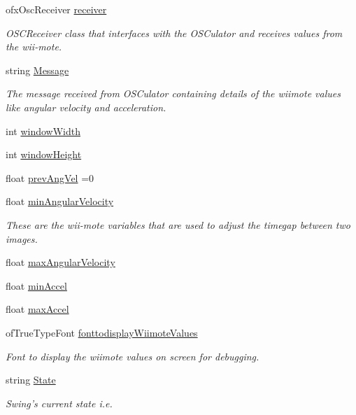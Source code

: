 \begin{DoxyCompactItemize}
ofx\-Osc\-Receiver \hyperlink{group___wii_mote_ga034c44ff60fa1e5f021e90d5410ba657}{receiver}
\begin{DoxyCompactList}\small\item\em O\-S\-C\-Receiver class that interfaces with the O\-S\-Culator and receives values from the wii-\/mote. \end{DoxyCompactList}\item 
string \hyperlink{group___wii_mote_ga0124035d0454fb6bd9152f8a87c40677}{Message}
\begin{DoxyCompactList}\small\item\em The message received from O\-S\-Culator containing details of the wiimote values like angular velocity and acceleration. \end{DoxyCompactList}\item 
int \hyperlink{group___wii_mote_ga9ed611377cd46f5148a3a3d538e96484}{window\-Width}
\item 
int \hyperlink{group___wii_mote_ga4e8884eeef5b2657b62278969d4e3dcf}{window\-Height}
\item 
float \hyperlink{group___wii_mote_ga8a2b9b9cf76097e20f148b616297029b}{prev\-Ang\-Vel} =0
\item 
float \hyperlink{classtest_app_ac559756a01e0b98378bc29dfba9fac79}{min\-Angular\-Velocity}
\begin{DoxyCompactList}\small\item\em These are the wii-\/mote variables that are used to adjust the timegap between two images. \end{DoxyCompactList}\item 
float \hyperlink{classtest_app_ab9565e8e6dc748ef68e6845f5f94cae9}{max\-Angular\-Velocity}
\item 
float \hyperlink{classtest_app_ab007edbc20b09d607f8010e2dbafdb97}{min\-Accel}
\item 
float \hyperlink{classtest_app_a34e834a5e4d359700147a74eece8eed1}{max\-Accel}
\item 
of\-True\-Type\-Font \hyperlink{classtest_app_ab336e228840f001d15f9b1eb3a30972f}{fonttodisplay\-Wiimote\-Values}
\begin{DoxyCompactList}\small\item\em Font to display the wiimote values on screen for debugging. \end{DoxyCompactList}\item 
string \hyperlink{classtest_app_a8ce5505df4526abed238956b65956edd}{State}
\begin{DoxyCompactList}\small\item\em Swing's current state i.\-e. \end{DoxyCompactList}\item 

\end{DoxyCompactItemize}
